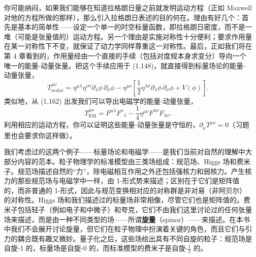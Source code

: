 你可能纳闷，如果我们能够在知道拉格朗日量之前就发明运动方程（正如 Maxwell 对他的方程所做的那样），那么引入拉格朗日表述的目的何在。理由有好几个：首先是基本的简单性——设定一个单一的时空标量函数，即拉格朗日密度，而不是一堆（可能是张量值的）运动方程。另一个理由是实施对称性十分便利；要求作用量在某一对称性下不变，就保证了动力学同样尊重这一对称性。最后，正如我们将在第 4 章看到的，作用量经由一个直接的手续（包括对度规本身求变分）导向一个唯一的能量-动量张量。把这个手续应用于 (1.148)，就直接得到标量场论的能量-动量张量，
\begin{equation*}
T^{\mu\nu}_{\text{scalar}} = \eta^{\mu\lambda}\eta^{\nu\sigma}\partial_{\lambda}\phi\,\partial_{\sigma}\phi - \eta^{\mu\nu}\left[\frac{1}{2}\eta^{\lambda\sigma}\partial_{\lambda}\phi\,\partial_{\sigma}\phi + V(\phi)\right].
\tag{1.170}
\end{equation*}
类似地，从 (1.162) 出发我们可以导出电磁学的能量-动量张量，
\begin{equation*}
T^{\mu\nu}_{\text{EM}} = F^{\mu\lambda}F^{\nu}{}_{\lambda} - \frac{1}{4}\eta^{\mu\nu}F^{\lambda\sigma}F_{\lambda\sigma}.
\tag{1.171}
\end{equation*}
利用相应的运动方程，你可以证明这些能量-动量张量是守恒的，$\partial_{\mu}T^{\mu\nu}=0$（习题里也会要求你这样做）。

我们考虑过的这两个例子——标量场论和电磁学——是我们当前对自然的理解中大部分内容的范本。粒子物理学的标准模型由三类场组成：规范场、Higgs 场和费米子。规范场描述自然的“力”，除电磁相互作用之外还包括强核力和弱核力。产生核力的那些规范场与电磁学中一样，由 1-形式势来描述；区别在于它们是矩阵值的，而非普通的 1-形式，因此与规范变换相对应的对称群是非对易（非阿贝尔）的对称性。Higgs 场和我们描述过的标量场非常相像，尽管它们也是矩阵值的。费米子包括轻子（例如电子和中微子）和夸克，它们不由我们这里讨论过的任何张量场来描述，而是由一种不同类型的场——所谓\textbf{旋量}（spinor）——来描述。在本书中我们不会展开讨论旋量，但它们在粒子物理中扮演着关键的角色，而且它们与引力的耦合既有趣又微妙。量子化之后，这些场给出具有不同自旋的粒子：规范场是自旋-1 的，标量场是自旋-0 的，而标准模型的费米子是自旋-$\frac{1}{2}$ 的。

